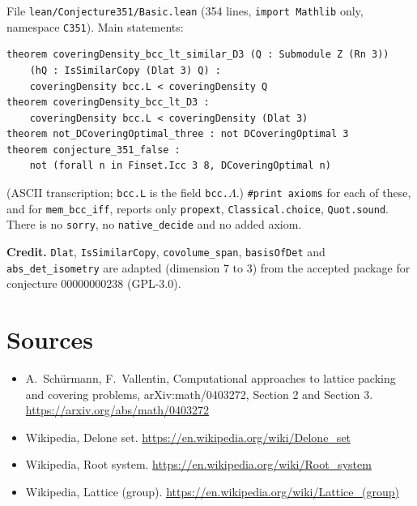 \documentclass[11pt]{article}
\theoremstyle{definition}
\theoremstyle{remark}
\begin{document}
File \texttt{lean/Conjecture351/Basic.lean} (354 lines, \texttt{import Mathlib} only, namespace
\texttt{C351}). Main statements:
\begin{verbatim}
theorem coveringDensity_bcc_lt_similar_D3 (Q : Submodule Z (Rn 3))
    (hQ : IsSimilarCopy (Dlat 3) Q) :
    coveringDensity bcc.L < coveringDensity Q
theorem coveringDensity_bcc_lt_D3 :
    coveringDensity bcc.L < coveringDensity (Dlat 3)
theorem not_DCoveringOptimal_three : not DCoveringOptimal 3
theorem conjecture_351_false :
    not (forall n in Finset.Icc 3 8, DCoveringOptimal n)
\end{verbatim}
(ASCII transcription; \texttt{bcc.L} is the field \texttt{bcc.$\Lambda$}.)
\texttt{\#print axioms} for each of these, and for \texttt{mem\_bcc\_iff}, reports only
\texttt{propext}, \texttt{Classical.choice}, \texttt{Quot.sound}. There is no \texttt{sorry}, no
\texttt{native\_decide} and no added axiom.

\textbf{Credit.} \texttt{Dlat}, \texttt{IsSimilarCopy}, \texttt{covolume\_span},
\texttt{basisOfDet} and \texttt{abs\_det\_isometry} are adapted (dimension 7 to 3) from the accepted
package for conjecture 00000000238 (GPL-3.0).

\section*{Sources}
\begin{itemize}
\item A.~Sch\"urmann, F.~Vallentin, Computational approaches to lattice packing and covering
  problems, arXiv:math/0403272, Section 2 and Section 3. \url{https://arxiv.org/abs/math/0403272}
\item Wikipedia, Delone set. \url{https://en.wikipedia.org/wiki/Delone_set}
\item Wikipedia, Root system. \url{https://en.wikipedia.org/wiki/Root_system}
\item Wikipedia, Lattice (group). \url{https://en.wikipedia.org/wiki/Lattice_(group)}
\end{itemize}
\end{document}
